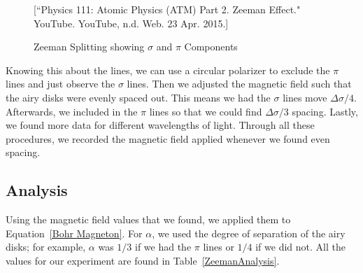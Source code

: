 \begin{figure}[tt]
  \begin{center}
  \end{center}
  \caption{Zeeman Splitting showing $\sigma$ and $\pi$ Components}[\footnotesize{``Physics 111: Atomic Physics (ATM) Part 2. Zeeman Effect." YouTube. YouTube, n.d. Web. 23 Apr. 2015.}]
  \label{Sigma and Pi}
\end{figure}

Knowing this about the lines, we can use a circular polarizer to exclude the $\pi$ lines and just observe the $\sigma$ lines. Then we adjusted the magnetic field such that the airy disks were evenly spaced out. This means we had the $\sigma$ lines move $\Delta \sigma / 4$. Afterwards, we included in the $\pi$ lines so that we could find $\Delta \sigma /3$ spacing. Lastly, we found more data for different wavelengths of light. Through all these procedures, we recorded the magnetic field applied whenever we found even spacing. 

\subsection{Analysis}

Using the magnetic field values that we found, we applied them to Equation~\ref{Bohr Magneton}. For $\alpha$, we used the degree of separation of the airy disks; for example, $\alpha$ was $1/3$ if we had the $\pi$ lines or $1/4$ if we did not. All the values for our experiment are found in Table~\ref{ZeemanAnalysis}.

